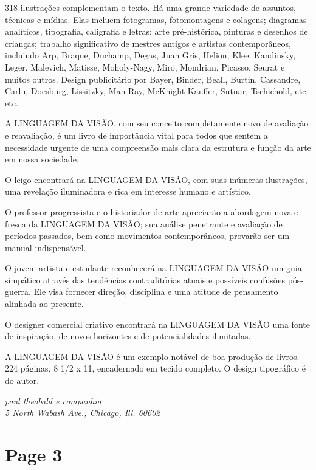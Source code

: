 \documentclass[a4paper]{article}
\begin{document}
318 ilustrações complementam o texto. Há uma grande variedade de assuntos, técnicas e mídias. Elas incluem fotogramas, fotomontagens e colagens; diagramas analíticos, tipografia, caligrafia e letras; arte pré-histórica, pinturas e desenhos de crianças; trabalho significativo de mestres antigos e artistas contemporâneos, incluindo Arp, Braque, Duchamp, Degas, Juan Gris, Helion, Klee, Kandinsky, Leger, Malevich, Matisse, Moholy-Nagy, Miro, Mondrian, Picasso, Seurat e muitos outros. Design publicitário por Bayer, Binder, Beall, Burtin, Cassandre, Carlu, Doesburg, Lissitzky, Man Ray, McKnight Kauffer, Sutnar, Tschichold, etc. etc.

A {\scshape LINGUAGEM DA VISÃO}, com seu conceito completamente novo de avaliação e reavaliação, é um livro de importância vital para todos que sentem a necessidade urgente de uma compreensão mais clara da estrutura e função da arte em nossa sociedade.

O leigo encontrará na {\scshape LINGUAGEM DA VISÃO}, com suas inúmeras ilustrações, uma revelação iluminadora e rica em interesse humano e artístico.

O professor progressista e o historiador de arte apreciarão a abordagem nova e fresca da {\scshape LINGUAGEM DA VISÃO}; sua análise penetrante e avaliação de períodos passados, bem como movimentos contemporâneos, provarão ser um manual indispensável.

O jovem artista e estudante reconhecerá na {\scshape LINGUAGEM DA VISÃO} um guia simpático através das tendências contraditórias atuais e possíveis confusões pós-guerra. Ele visa fornecer direção, disciplina e uma atitude de pensamento alinhada ao presente.

O designer comercial criativo encontrará na {\scshape LINGUAGEM DA VISÃO} uma fonte de inspiração, de novos horizontes e de potencialidades ilimitadas.

A {\scshape LINGUAGEM DA VISÃO} é um exemplo notável de boa produção de livros. 224 páginas, 8 1/2 x 11, encadernado em tecido completo. O design tipográfico é do autor.

\vspace{2em} %

{\centering
\itshape paul theobald e companhia \\
5 North Wabash Ave., Chicago, Ill. 60602
\par
}

\newpage
\section*{Page 3}
\end{document}
